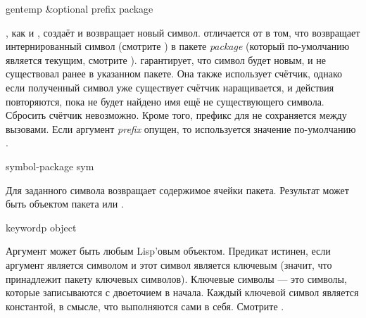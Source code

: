 \begin{defun}[Функция]
gentemp &optional prefix package

, как и , создаёт и возвращает новый символ.
 отличается от  в том, что возвращает интернированный
символ (смотрите ) в пакете \emph{package} (который по-умолчанию
является текущим, смотрите ).  гарантирует, что
символ будет новым, и не существовал ранее в указанном пакете. Она также
использует счётчик, однако если полученный символ уже существует счётчик
наращивается, и действия повторяются, пока не будет найдено имя ещё не
существующего символа.
Сбросить счётчик невозможно.
Кроме того, префикс для  не сохраняется между вызовами. Если
аргумент \emph{prefix} опущен, то используется значение по-умолчанию .
\end{defun}

\begin{defun}[Функция]
symbol-package sym

Для заданного символа возвращает содержимое ячейки пакета. Результат может быть
объектом пакета или {\nil}.
\end{defun}

\begin{defun}[Функция]
keywordp object

Аргумент может быть любым Lisp'овым объектом. Предикат  истинен,
если аргумент является символом и этот символ является ключевым (значит, что
принадлежит пакету ключевых символов). Ключевые символы --- это символы, которые
записываются с двоеточием в начала. Каждый ключевой символ является константой,
в смысле, что выполняются сами в себя. Смотрите .
\end{defun}

\fi